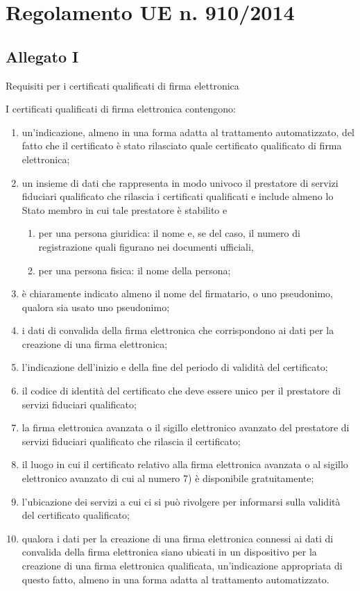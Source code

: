 \chapter{Regolamento UE n. 910/2014}
\section{Allegato I}\label{sec:allegatoIreg9102014}
Requisiti per i certificati qualificati di firma elettronica\par I certificati qualificati di firma elettronica contengono:
\begin{enumerate}
	\item 	un’indicazione, almeno in una forma adatta al trattamento automatizzato, del fatto che il certificato è stato rilasciato quale certificato qualificato di firma elettronica;
	\item un insieme di dati che rappresenta in modo univoco il prestatore di servizi fiduciari qualificato che rilascia i certificati qualificati e include almeno lo Stato membro in cui tale prestatore è stabilito e
	\begin{enumerate}
		\item per una persona giuridica: il nome e, se del caso, il numero di registrazione quali figurano nei documenti ufficiali,
		\item per una persona fisica: il nome della persona;
	\end{enumerate}
\item è chiaramente indicato almeno il nome del firmatario, o uno pseudonimo, qualora sia usato uno pseudonimo;
\item i dati di convalida della firma elettronica che corrispondono ai dati per la creazione di una firma elettronica;
\item l’indicazione dell’inizio e della fine del periodo di validità del certificato;
\item il codice di identità del certificato che deve essere unico per il prestatore di servizi fiduciari qualificato;
\item 	
la firma elettronica avanzata o il sigillo elettronico avanzato del prestatore di servizi fiduciari qualificato che rilascia il certificato;
\item il luogo in cui il certificato relativo alla firma elettronica avanzata o al sigillo elettronico avanzato di cui al numero 7) è disponibile gratuitamente;
\item 	
l’ubicazione dei servizi a cui ci si può rivolgere per informarsi sulla validità del certificato qualificato;
\item qualora i dati per la creazione di una firma elettronica connessi ai dati di convalida della firma elettronica siano ubicati in un dispositivo per la creazione di una firma elettronica qualificata, un’indicazione appropriata di questo fatto, almeno in una forma adatta al trattamento automatizzato.
\end{enumerate}
